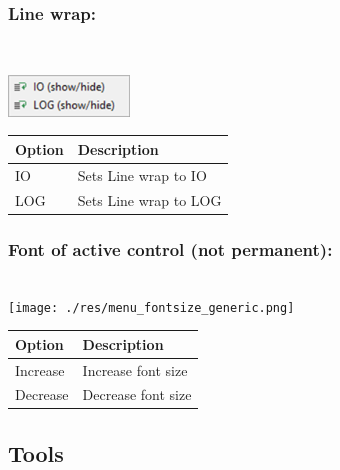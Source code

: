 \hypertarget{menu_view_r_term_linewrap}{}
\subsubsection{Line wrap:}\\

\includegraphics[scale=0.50]{./res/menu_r_term_linewrap.png}\\

\begin{scriptsize}
  \begin{tabularx}{\textwidth}{>{\hsize=0.3\hsize}X>{\hsize=0.7\hsize}X}\\
    \hline
    \textbf{Option} & \textbf{Description} \\
    \hline
    IO & Sets Line wrap to IO \\
    LOG & Sets Line wrap to LOG \\
    \hline
  \end{tabularx}
\end{scriptsize}


\hypertarget{menu_r_term_fontsize}{}
\subsubsection{Font of active control (not permanent):}\\

\texttt{[image: ./res/menu\_fontsize\_generic.png]}\\

\begin{scriptsize}
  \begin{tabularx}{\textwidth}{>{\hsize=0.3\hsize}X>{\hsize=0.7\hsize}X}\\
    \hline
    \textbf{Option} & \textbf{Description} \\
    \hline
    Increase & Increase font size \\
    Decrease & Decrease font size \\
    \hline
  \end{tabularx}
\end{scriptsize}


\hypertarget{menu_view_tools}{}
\subsection{Tools}

